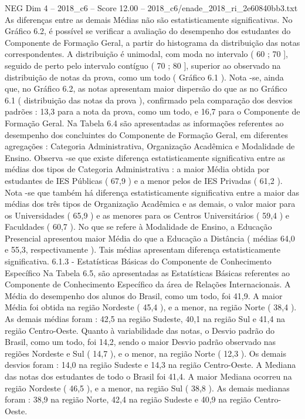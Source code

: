 \begin{textsample}{NEG Dim 4 – 2018\_c6 – Score 12.00 – 2018\_c6/enade\_2018\_ri\_2e60840bb3.txt}
As diferenças entre as demais Médias não são estatisticamente significativas.
No Gráfico 6.2, é possível se verificar a avaliação do desempenho dos estudantes do Componente de Formação Geral, a partir do histograma da distribuição das notas correspondentes.
A distribuição é unimodal, com moda no intervalo ( 60 ; 70 ], seguido de perto pelo intervalo contíguo ( 70 ; 80 ], superior ao observado na distribuição de notas da prova, como um todo ( Gráfico 6.1 ).
Nota -se, ainda que, no Gráfico 6.2, as notas apresentam maior dispersão do que as no Gráfico 6.1 ( distribuição das notas da prova ), confirmado pela comparação dos desvios padrões : 13,3 para a nota da prova, como um todo, e 16,7 para o Componente de Formação Geral.
Na Tabela 6.4 são apresentadas as informações referentes ao desempenho dos concluintes do Componente de Formação Geral, em diferentes agregações : Categoria Administrativa, Organização Acadêmica e Modalidade de Ensino.
Observa -se que existe diferença estatisticamente significativa entre as médias dos tipos de Categoria Administrativa : a maior Média obtida por estudantes de IES Públicas ( 67,9 ) e a menor pelos de IES Privadas ( 61,2 ).
Nota -se que também há diferença estatisticamente significativa entre a maior das médias dos três tipos de Organização Acadêmica e as demais, o valor maior para os Universidades ( 65,9 ) e as menores para os Centros Universitários ( 59,4 ) e Faculdades ( 60,7 ).
No que se refere à Modalidade de Ensino, a Educação Presencial apresentou maior Média do que a Educação a Distância ( médias 64,0 e 55,3, respectivamente ).
Tais médias apresentam diferença estatisticamente significativa. 6.1.3 - Estatísticas Básicas do Componente de Conhecimento Específico Na Tabela 6.5, são apresentadas as Estatísticas Básicas referentes ao Componente de Conhecimento Específico da área de Relações Internacionais.
A Média do desempenho dos alunos do Brasil, como um todo, foi 41,9.
A maior Média foi obtida na região Nordeste ( 45,4 ), e a menor, na região Norte ( 38,4 ).
As demais médias foram : 42,5 na região Sudeste, 40,1 na região Sul e 41,4 na região Centro-Oeste.
Quanto à variabilidade das notas, o Desvio padrão do Brasil, como um todo, foi 14,2, sendo o maior Desvio padrão observado nas regiões Nordeste e Sul ( 14,7 ), e o menor, na região Norte ( 12,3 ).
Os demais desvios foram : 14,0 na região Sudeste e 14,3 na região Centro-Oeste.
A Mediana das notas dos estudantes de todo o Brasil foi 41,4.
A maior Mediana ocorreu na região Nordeste ( 46,5 ), e a menor, na região Sul ( 38,8 ).
As demais medianas foram : 38,9 na região Norte, 42,4 na região Sudeste e 40,9 na região Centro-Oeste.

\end{textsample}
